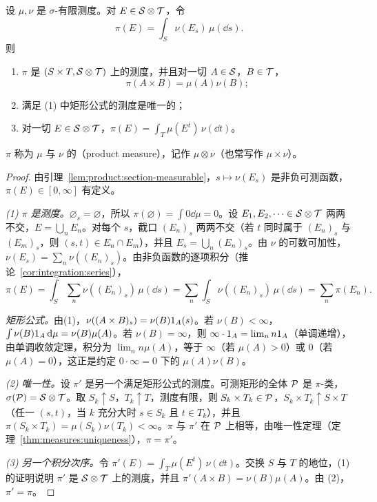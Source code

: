\begin{theorem}[乘积测度]\label{thm:product:product-measure}
设 $\mu,\nu$ 是 $\sigma$-有限测度。对 $E\in\mathcal{S}\otimes\mathcal{T}$，令
\[
\pi(E)=\int_S\nu(E_s)\,\mu(\dd s).
\]
则
\begin{enumerate}
\item $\pi$ 是 $(S\times T,\mathcal{S}\otimes\mathcal{T})$ 上的测度，并且对一切 $A\in\mathcal{S}$，$B\in\mathcal{T}$，
\[
\pi(A\times B)=\mu(A)\nu(B);
\]
\item 满足 (1) 中矩形公式的测度是唯一的；
\item 对一切 $E\in\mathcal{S}\otimes\mathcal{T}$，$\pi(E)=\int_T\mu(E^t)\,\nu(\dd t)$。
\end{enumerate}
$\pi$ 称为 $\mu$ 与 $\nu$ 的（product measure），记作 $\mu\otimes\nu$（也常写作 $\mu\times\nu$）。
\end{theorem}
\begin{proof}
由引理~\ref{lem:product:section-measurable}，$s\mapsto\nu(E_s)$ 是非负可测函数，$\pi(E)\in[0,\infty]$ 有定义。

\emph{(1) $\pi$ 是测度。}$\varnothing_s=\varnothing$，所以 $\pi(\varnothing)=\int0\dd\mu=0$。设 $E_1,E_2,\dots\in\mathcal{S}\otimes\mathcal{T}$ 两两不交，$E=\bigcup_nE_n$。对每个 $s$，截口 $(E_n)_s$ 两两不交（若 $t$ 同时属于 $(E_n)_s$ 与 $(E_m)_s$，则 $(s,t)\in E_n\cap E_m$），并且 $E_s=\bigcup_n(E_n)_s$。由 $\nu$ 的可数可加性，$\nu(E_s)=\sum_n\nu((E_n)_s)$。由非负函数的逐项积分（推论~\ref{cor:integration:series}），
\[
\pi(E)=\int_S\sum_n\nu((E_n)_s)\,\mu(\dd s)=\sum_n\int_S\nu((E_n)_s)\,\mu(\dd s)=\sum_n\pi(E_n).
\]

\emph{矩形公式。}由(1)，$\nu((A\times B)_s)=\nu(B)1_A(s)$。若 $\nu(B)<\infty$，$\int\nu(B)1_A\,\mathrm{d}\mu=\nu(B)\mu(A)$。若 $\nu(B)=\infty$，则 $\infty\cdot1_A=\lim_nn1_A$（单调递增），由单调收敛定理，积分为 $\lim_nn\mu(A)$，等于 $\infty$（若 $\mu(A)>0$）或 $0$（若 $\mu(A)=0$），这正是约定 $0\cdot\infty=0$ 下的 $\mu(A)\nu(B)$。

\emph{(2) 唯一性。}设 $\pi'$ 是另一个满足矩形公式的测度。可测矩形的全体 $\mathcal{P}$ 是 $\pi$-类，$\sigma(\mathcal{P})=\mathcal{S}\otimes\mathcal{T}$。取 $S_k\uparrow S$，$T_k\uparrow T$，测度有限，则 $S_k\times T_k\in\mathcal{P}$，$S_k\times T_k\uparrow S\times T$（任一 $(s,t)$，当 $k$ 充分大时 $s\in S_k$ 且 $t\in T_k$），并且 $\pi(S_k\times T_k)=\mu(S_k)\nu(T_k)<\infty$。$\pi$ 与 $\pi'$ 在 $\mathcal{P}$ 上相等，由唯一性定理（定理~\ref{thm:measures:uniqueness}），$\pi=\pi'$。

\emph{(3) 另一个积分次序。}令 $\pi'(E)=\int_T\mu(E^t)\,\nu(\dd t)$。交换 $S$ 与 $T$ 的地位，(1) 的证明说明 $\pi'$ 是 $\mathcal{S}\otimes\mathcal{T}$ 上的测度，并且 $\pi'(A\times B)=\nu(B)\mu(A)$。由 (2)，$\pi'=\pi$。
\end{proof}


